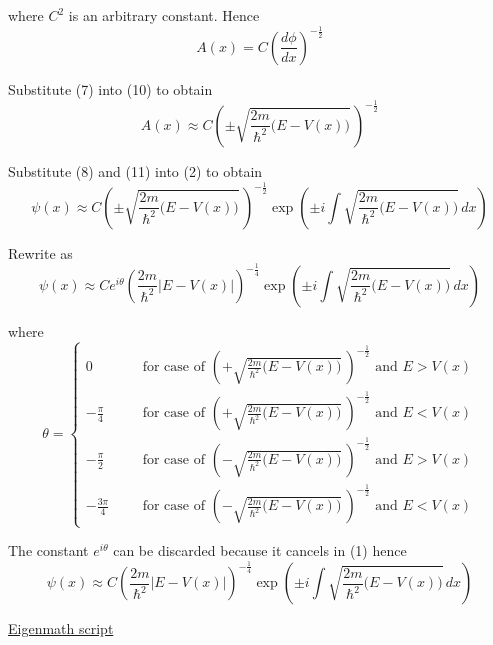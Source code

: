 where $C^2$ is an arbitrary constant. Hence
\begin{equation*}
A(x)=C\left(\frac{d\phi}{dx}\right)^{-\frac{1}{2}}
\tag{10}
\end{equation*}

Substitute (7) into (10) to obtain
\begin{equation*}
A(x)\approx C
\left(\pm\sqrt{\frac{2m}{\hbar^2}\bigl(E-V(x)\bigr)}\,\right)^{-\frac{1}{2}}
\tag{11}
\end{equation*}

Substitute (8) and (11) into (2) to obtain
\begin{equation*}
\psi(x)\approx C
\left(\pm\sqrt{\frac{2m}{\hbar^2}\bigl(E-V(x)\bigr)}\,\right)^{-\frac{1}{2}}
\exp\left(\pm i\int\sqrt{\frac{2m}{\hbar^2}\bigl(E-V(x)\bigr)}\,dx\right)
\end{equation*}

Rewrite as
\begin{equation*}
\psi(x)\approx Ce^{i\theta}
\left(\frac{2m}{\hbar^2}\bigl|E-V(x)\bigr|\right)^{-\frac{1}{4}}
\exp\left(\pm i\int\sqrt{\frac{2m}{\hbar^2}\bigl(E-V(x)\bigr)}\,dx\right)
\tag{12}
\end{equation*}

where
\begin{equation*}
\theta=\left\{
\begin{aligned}
0& &
&\text{for case of $\left(+\sqrt{\frac{2m}{\hbar^2}\bigl(E-V(x)\bigr)}\,\right)^{-\frac{1}{2}}$ and $E>V(x)$}
\\[1ex]
-\frac{\pi}{4}& &
&\text{for case of $\left(+\sqrt{\frac{2m}{\hbar^2}\bigl(E-V(x)\bigr)}\,\right)^{-\frac{1}{2}}$ and $E<V(x)$}
\\[1ex]
-\frac{\pi}{2}& &
&\text{for case of $\left(-\sqrt{\frac{2m}{\hbar^2}\bigl(E-V(x)\bigr)}\,\right)^{-\frac{1}{2}}$ and $E>V(x)$}
\\[1ex]
-\frac{3\pi}{4}& &
&\text{for case of $\left(-\sqrt{\frac{2m}{\hbar^2}\bigl(E-V(x)\bigr)}\,\right)^{-\frac{1}{2}}$ and $E<V(x)$}
\end{aligned}
\right.
\end{equation*}

The constant $e^{i\theta}$ can be discarded because it cancels in (1) hence
\begin{equation*}
\psi(x)\approx C
\left(\frac{2m}{\hbar^2}\bigl|E-V(x)\bigr|\right)^{-\frac{1}{4}}
\exp\left(\pm i\int\sqrt{\frac{2m}{\hbar^2}\bigl(E-V(x)\bigr)}\,dx\right)
\end{equation*}

\href{https://georgeweigt.github.io/examples/wkb-method-part-1-demo.html}{Eigenmath script}


